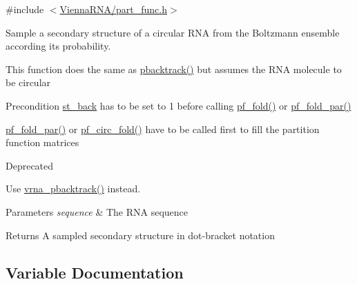 {\ttfamily \#include $<$\mbox{\hyperlink{part__func_8h}{Vienna\+R\+N\+A/part\+\_\+func.\+h}}$>$}



Sample a secondary structure of a circular R\+NA from the Boltzmann ensemble according its probability. 

This function does the same as \mbox{\hyperlink{group__subopt__stochbt_gac03ca6db186bb3bf0a2a326d7fb3ba03}{pbacktrack()}} but assumes the R\+NA molecule to be circular

\begin{DoxyPrecond}{Precondition}
\mbox{\hyperlink{group__subopt__stochbt_gacd79b1a570e6ad9be24cb11fe8cae30a}{st\+\_\+back}} has to be set to 1 before calling \mbox{\hyperlink{group__pf__fold_gadc3db3d98742427e7001a7fd36ef28c2}{pf\+\_\+fold()}} or \mbox{\hyperlink{group__pf__fold_gac4f95bee734b2563a3d6e9932117ebdf}{pf\+\_\+fold\+\_\+par()}} 

\mbox{\hyperlink{group__pf__fold_gac4f95bee734b2563a3d6e9932117ebdf}{pf\+\_\+fold\+\_\+par()}} or \mbox{\hyperlink{group__pf__fold_ga819ce5fca8984004ac81c4a3b04cb735}{pf\+\_\+circ\+\_\+fold()}} have to be called first to fill the partition function matrices
\end{DoxyPrecond}
\begin{DoxyRefDesc}{Deprecated}
\item[\mbox{\hyperlink{deprecated__deprecated000105}{Deprecated}}]Use \mbox{\hyperlink{group__subopt__stochbt_ga901fe42a33b07be083421741bf7dc610}{vrna\+\_\+pbacktrack()}} instead.\end{DoxyRefDesc}



\begin{DoxyParams}{Parameters}
{\em sequence} & The R\+NA sequence \\
\hline
\end{DoxyParams}
\begin{DoxyReturn}{Returns}
A sampled secondary structure in dot-\/bracket notation 
\end{DoxyReturn}


\subsection{Variable Documentation}
\mbox{\label{group__subopt__stochbt_gacd79b1a570e6ad9be24cb11fe8cae30a}} 

